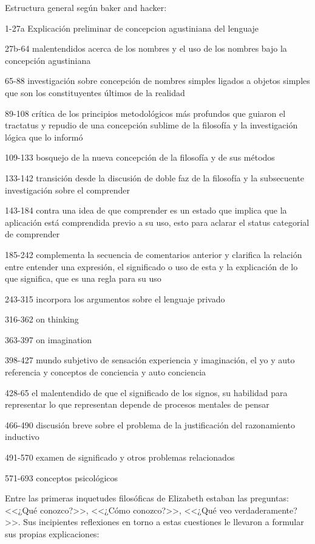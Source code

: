 Estructura general según baker and hacker:

1-27a Explicación preliminar de concepcion agustiniana del lenguaje

27b-64 malentendidos acerca de los nombres y el uso de los nombres bajo la
concepción agustiniana

65-88 investigación sobre concepción de nombres simples ligados a objetos
simples que son los constituyentes últimos de la realidad

89-108 crítica de los principios metodológicos más profundos que guiaron el
tractatus y repudio de una concepción sublime de la filosofía y la investigación
lógica que lo informó

109-133 bosquejo de la nueva concepción de la filosofía y de sus métodos

133-142 transición desde la discusión de doble faz de la filosofía y la
subsecuente investigación sobre el comprender

143-184 contra una idea de que comprender es un estado que implica que la
aplicación está comprendida previo a su uso, esto para aclarar el status
categorial de comprender

185-242 complementa la secuencia de comentarios anterior y clarifica la relación
entre entender una expresión, el significado o uso de esta y la explicación de
lo que significa, que es una regla para su uso

243-315
incorpora los argumentos sobre el lenguaje privado

316-362 on thinking

363-397 on imagination

398-427 mundo subjetivo de sensación experiencia y imaginación, el yo y auto
referencia y conceptos de conciencia y auto conciencia

428-65 el malentendido de que el significado de los signos, su habilidad para
representar lo que representan depende de procesos mentales de pensar

466-490 discusión breve sobre el problema de la justificación del razonamiento
inductivo

491-570 examen de significado y otros problemas relacionados

571-693 conceptos psicológicos




   Entre las primeras inquetudes filosóficas de Elizabeth estaban las preguntas:
   <<¿Qué conozco?>>, <<¿Cómo conozco?>>, <<¿Qué veo verdaderamente?>>. Sus
   incipientes reflexiones en torno a estas cuestiones le llevaron a formular sus
   propias explicaciones:

